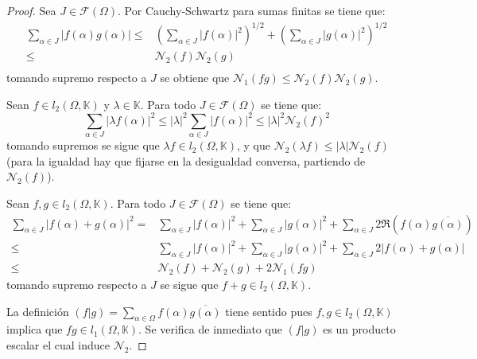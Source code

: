 \documentclass[12pt]{report}
\theoremstyle{largebreak}
\newcommand\abs[1]{\ensuremath{\big|#1\big|}}
\newcommand\pint[2]{\ensuremath{\left(#1\big| #2\right)}}
\newcommand\conj[1]{\ensuremath{\overline{#1}}}
\begin{document}
    \begin{proof}
        Sea $J\in\mathcal{F}(\Omega)$. Por Cauchy-Schwartz para sumas finitas se tiene que:
        \begin{equation*}
            \begin{split}
                \sum_{\alpha\in J }\abs{f(\alpha)g(\alpha)}\leq&\left( \sum_{\alpha\in J }\abs{f(\alpha)}^2 \right)^{1/2}+\left( \sum_{\alpha\in J }\abs{g(\alpha)}^2 \right)^{1/2}\\
                \leq&\mathcal{N}_2(f)\mathcal{N}_2(g) \\
            \end{split}
        \end{equation*}
        tomando supremo respecto a $J$ se obtiene que $\mathcal{N}_1(fg)\leq\mathcal{N}_2(f)\mathcal{N}_2(g)$.

        Sean $f\in l_2(\Omega,\mathbb{K})$ y $\lambda\in\mathbb{K}$. Para todo $J\in\mathcal{F}(\Omega)$ se tiene que:
        \begin{equation*}
            \sum_{\alpha\in J}\abs{\lambda f(\alpha)}^2\leq\abs{\lambda}^2\sum_{\alpha\in J}\abs{f(\alpha)}^2\leq\abs{\lambda}^2\mathcal{N}_2(f)^2
        \end{equation*}
        tomando supremos se sigue que $\lambda f\in l_2(\Omega,\mathbb{K})$, y que $\mathcal{N}_2(\lambda f)\leq\abs{\lambda}\mathcal{N}_2(f)$ (para la igualdad hay que fijarse en la desigualdad conversa, partiendo de $\mathcal{N}_2(f)$).

        Sean $f,g\in l_2(\Omega,\mathbb{K})$. Para todo $J\in\mathcal{F}(\Omega)$ se tiene que:
        \begin{equation*}
            \begin{split}
                \sum_{\alpha\in J }\abs{f(\alpha)+g(\alpha)}^2=&\sum_{\alpha\in J }\abs{f(\alpha)}^2+\sum_{\alpha\in J }\abs{g(\alpha)}^2+\sum_{\alpha\in J }2\Re(f(\alpha)\conj{g(\alpha)})\\
                \leq&\sum_{\alpha\in J }\abs{f(\alpha)}^2+\sum_{\alpha\in J }\abs{g(\alpha)}^2+\sum_{\alpha\in J }2\abs{f(\alpha)+g(\alpha)}\\
                \leq& \mathcal{N}_2(f)+\mathcal{N}_2(g)+2\mathcal{N}_1(fg)
            \end{split}
        \end{equation*}
        tomando supremo respecto a $J$ se sigue que $f+g\in l_2(\Omega,\mathbb{K})$.

        La definición $\pint{f}{g}=\sum_{\alpha\in\Omega}f(\alpha)\conj{g(\alpha)}$ tiene sentido pues $f,g\in l_2(\Omega,\mathbb{K})$ implica que $fg\in l_1(\Omega,\mathbb{K})$. Se verifica de inmediato que $\pint{f}{g}$ es un producto escalar el cual induce $\mathcal{N}_2$.


\end{proof}
\end{document}
